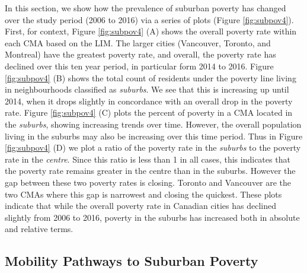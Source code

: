 In this section, we show how the prevalence of suburban poverty has changed over the study period (2006 to 2016) via a series of plots (Figure \ref{fig:subpov4}). First, for context, Figure \ref{fig:subpov4} (A) shows the overall poverty rate within each CMA based on the LIM. The larger cities (Vancouver, Toronto, and Montreal) have the greatest poverty rate, and overall, the poverty rate has declined over this ten year period, in particular form 2014 to 2016. Figure \ref{fig:subpov4} (B) shows the total count of residents under the poverty line living in neighbourhoods classified as \textit{suburbs}. We see that this is increasing up until 2014, when it drops slightly in concordance with an overall drop in the poverty rate. Figure \ref{fig:subpov4} (C) plots the percent of poverty in a CMA located in the \textit{suburbs}, showing increasing trends over time. However, the overall population living in the suburbs may also be increasing over this time period. Thus in Figure \ref{fig:subpov4} (D) we plot a ratio of the poverty rate in the \textit{suburbs} to the poverty rate in the \textit{centre}. Since this ratio is less than 1 in all cases, this indicates that the poverty rate remains greater in the centre than in the suburbs. However the gap between these two poverty rates is closing. Toronto and Vancouver are the two CMAs where this gap is narrowest and closing the quickest. These plots indicate that while the overall poverty rate in Canadian cities has declined slightly from 2006 to 2016, poverty in the suburbs has increased both in absolute and relative terms.






\subsection{Mobility Pathways to Suburban Poverty}

